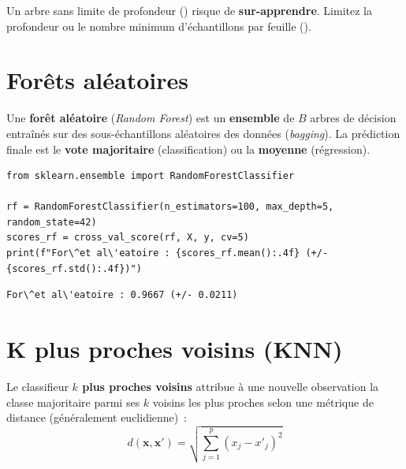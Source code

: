 \begin{attention}
Un arbre sans limite de profondeur () risque de \textbf{sur-apprendre}. Limitez la profondeur ou le nombre minimum d'\'echantillons par feuille ().
\end{attention}

\section{For\^ets al\'eatoires}
\label{sec:forets_aleatoires}


\begin{definition}
Une \textbf{for\^et al\'eatoire} (\textit{Random Forest}) est un \textbf{ensemble} de $B$ arbres de d\'ecision entra\^in\'es sur des sous-\'echantillons al\'eatoires des donn\'ees (\textit{bagging}). La pr\'ediction finale est le \textbf{vote majoritaire} (classification) ou la \textbf{moyenne} (r\'egression).
\end{definition}

\begin{codeblock}[title=\textbf{Python}]
\begin{verbatim}
from sklearn.ensemble import RandomForestClassifier

rf = RandomForestClassifier(n_estimators=100, max_depth=5, random_state=42)
scores_rf = cross_val_score(rf, X, y, cv=5)
print(f"For\^et al\'eatoire : {scores_rf.mean():.4f} (+/- {scores_rf.std():.4f})")
\end{verbatim}
\end{codeblock}

\begin{codeoutput}
\begin{verbatim}
For\^et al\'eatoire : 0.9667 (+/- 0.0211)
\end{verbatim}
\end{codeoutput}

\section{K plus proches voisins (KNN)}
\label{sec:knn_detail}


\begin{definition}[KNN]
Le classifieur \textbf{$k$ plus proches voisins} attribue \`a une nouvelle observation la classe majoritaire parmi ses $k$ voisins les plus proches selon une m\'etrique de distance (g\'en\'eralement euclidienne)~:
\[
d(\mathbf{x}, \mathbf{x}') = \sqrt{\sum_{j=1}^{p}(x_j - x'_j)^2}
\]
\end{definition}

